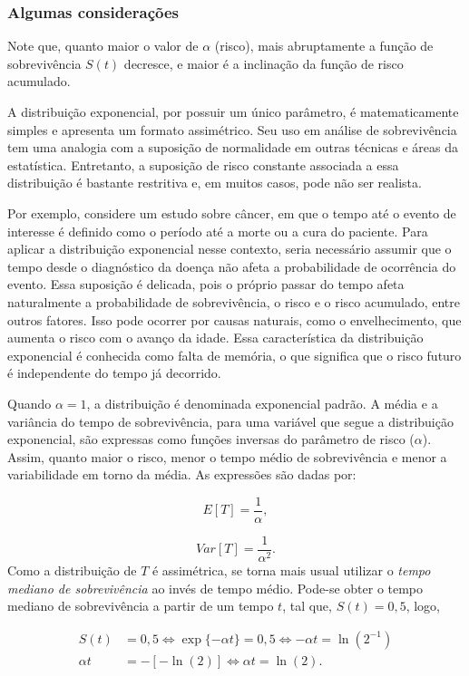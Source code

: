 \documentclass[
  12pt,
  letterpaper,
  DIV=11,
  numbers=noendperiod]{scrreprt}
\begin{document}
\subsubsection{Algumas considerações}\label{algumas-considerauxe7uxf5es}

Note que, quanto maior o valor de \(\alpha\) (risco), mais abruptamente
a função de sobrevivência \(S(t)\) decresce, e maior é a inclinação da
função de risco acumulado.

A distribuição exponencial, por possuir um único parâmetro, é
matematicamente simples e apresenta um formato assimétrico. Seu uso em
análise de sobrevivência tem uma analogia com a suposição de normalidade
em outras técnicas e áreas da estatística. Entretanto, a suposição de
risco constante associada a essa distribuição é bastante restritiva e,
em muitos casos, pode não ser realista.

Por exemplo, considere um estudo sobre câncer, em que o tempo até o
evento de interesse é definido como o período até a morte ou a cura do
paciente. Para aplicar a distribuição exponencial nesse contexto, seria
necessário assumir que o tempo desde o diagnóstico da doença não afeta a
probabilidade de ocorrência do evento. Essa suposição é delicada, pois o
próprio passar do tempo afeta naturalmente a probabilidade de
sobrevivência, o risco e o risco acumulado, entre outros fatores. Isso
pode ocorrer por causas naturais, como o envelhecimento, que aumenta o
risco com o avanço da idade. Essa característica da distribuição
exponencial é conhecida como falta de memória, o que significa que o
risco futuro é independente do tempo já decorrido.

Quando \(\alpha = 1\), a distribuição é denominada exponencial padrão. A
média e a variância do tempo de sobrevivência, para uma variável que
segue a distribuição exponencial, são expressas como funções inversas do
parâmetro de risco (\(\alpha\)). Assim, quanto maior o risco, menor o
tempo médio de sobrevivência e menor a variabilidade em torno da média.
As expressões são dadas por:

\[
E[T] = \dfrac{1}{\alpha},
\]

\[
Var[T] = \dfrac{1}{\alpha^2}.
\] Como a distribuição de \(T\) é assimétrica, se torna mais usual
utilizar o \emph{tempo mediano de sobrevivência} ao invés de tempo
médio. Pode-se obter o tempo mediano de sobrevivência a partir de um
tempo \(t\), tal que, \(S(t) = 0,5\), logo,

\begin{align*}
    S(t) & = 0,5 \Leftrightarrow \exp\{ -\alpha t \} = 0,5 \Leftrightarrow -\alpha t = \ln(2^{-1}) \\
    \alpha t & = - [-\ln(2)] \Leftrightarrow \alpha t = \ln(2).
\end{align*}
\end{document}
